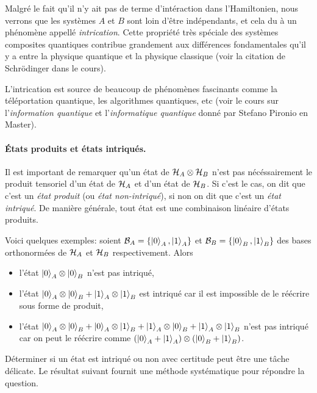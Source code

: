 \documentclass[11pt,a4paper,oneside]{article}
\begin{document}
Malgré le fait qu'il n'y ait pas de terme d'intéraction dans l'Hamiltonien, nous verrons que les systèmes $A$ et $B$ sont loin d'être indépendants, et cela du à un phénomène appellé \emph{intrication}. Cette propriété très spéciale des systèmes composites quantiques contribue grandement aux différences fondamentales qu'il y a entre la physique quantique et la physique classique (voir la citation de Schrödinger dans le cours). 

L'intrication est source de beaucoup de phénomènes fascinants comme la téléportation quantique, les algorithmes quantiques, etc (voir le cours sur l'\emph{information quantique} et l'\emph{informatique quantique} donné par Stefano Pironio en Master).

\paragraph*{États produits et états intriqués.} Il est important de remarquer qu'un état de $\mathcal{H}_A\otimes\mathcal{H}_B$ n'est pas nécéssairement le produit tensoriel d'un état de $\mathcal{H}_A$ et d'un état de $\mathcal{H}_B$. Si c'est le cas, on dit que c'est un \emph{état produit} (ou \emph{état non-intriqué}), si non on dit que c'est un \emph{état intriqué}. De manière générale, tout état est une combinaison linéaire d'états produits.

Voici quelques exemples: soient $\mathcal{B}_A=\{\ket{0}_A,\ket{1}_A\}$ et $\mathcal{B}_B=\{\ket{0}_B,\ket{1}_B\}$ des bases orthonormées de $\mathcal{H}_A$ et $\mathcal{H}_B$ respectivement. Alors
\begin{itemize}
    \item l'état $\ket{0}_A\otimes\ket{0}_B$ n'est pas intriqué,
    \item l'état $\ket{0}_A\otimes\ket{0}_B+\ket{1}_A\otimes\ket{1}_B$ est intriqué car il est impossible de le réécrire sous forme de produit,
    \item l'état $\ket{0}_A\otimes\ket{0}_B+\ket{0}_A\otimes\ket{1}_B+\ket{1}_A\otimes\ket{0}_B+\ket{1}_A\otimes\ket{1}_B$ n'est pas intriqué car on peut le réécrire comme $(\ket{0}_A+\ket{1}_A)\otimes(\ket{0}_B+\ket{1}_B)$.
\end{itemize}

Déterminer si un état est intriqué ou non avec certitude peut être une tâche délicate. Le résultat suivant fournit une méthode systématique pour répondre la question.
\end{document}
